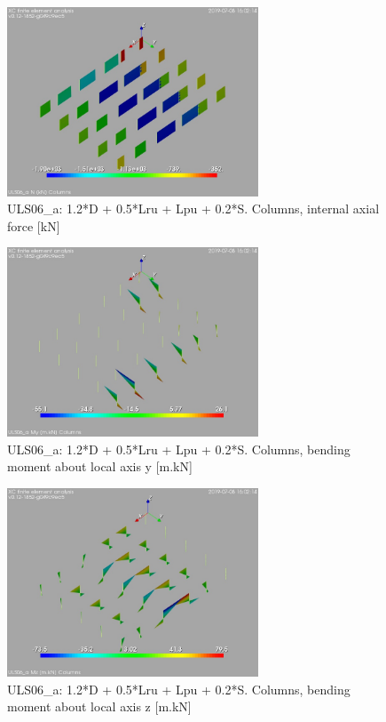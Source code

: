 \begin{figure}
\begin{center}
\includegraphics[width=75mm]{annex_res_columns/graphics/resSimplLC/ULS06_acolumnsN}
\caption{ULS06\_a: 1.2*D + 0.5*Lru + Lpu + 0.2*S. Columns, internal axial force [kN]}
\end{center}
\end{figure}
\begin{figure}
\begin{center}
\includegraphics[width=75mm]{annex_res_columns/graphics/resSimplLC/ULS06_acolumnsMy}
\caption{ULS06\_a: 1.2*D + 0.5*Lru + Lpu + 0.2*S. Columns, bending moment about local axis y [m.kN]}
\end{center}
\end{figure}
\begin{figure}
\begin{center}
\includegraphics[width=75mm]{annex_res_columns/graphics/resSimplLC/ULS06_acolumnsMz}
\caption{ULS06\_a: 1.2*D + 0.5*Lru + Lpu + 0.2*S. Columns, bending moment about local axis z [m.kN]}
\end{center}
\end{figure}

